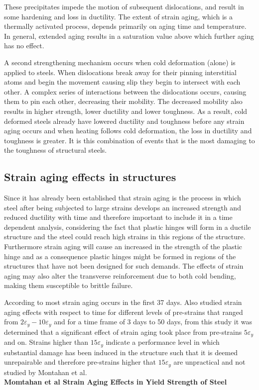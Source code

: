 These precipitates impede the motion of subsequent dislocations, and result in some hardening and loss in ductility. The extent of strain aging, which is a thermally activated process, depends primarily on aging time and temperature. In general, extended aging results in a saturation value above which further aging has no effect.

A second strengthening mechanism occurs when cold deformation (alone) is applied to steels. When dislocations break away for their pinning interstitial atoms and begin the movement causing slip they begin to intersect with each other. A complex series of interactions between the dislocations occurs, causing them to pin each other, decreasing their mobility. The decreased mobility also results in higher strength, lower ductility and lower toughness. As a result, cold deformed steels already have lowered ductility and toughness before any strain aging occurs and when heating follows cold deformation, the loss in ductility and toughness is greater. It is this combination of events that is the most damaging to the toughness of structural steels.

\subsection{Strain aging effects in structures}

Since it has already been established that strain aging is the process in which steel after being subjected to large strains develops an increased strength and reduced ductility with time and therefore important to include it in a time dependent analysis, considering the fact that plastic hinges will form in a ductile structure and the steel could reach high strains in this regions of the structure. Furthermore strain aging will cause an increased in the strength of the plastic hinge and as a consequence plastic hinges might be formed in regions of the structures that have not been designed for such demands. The effects of strain aging may also alter the transverse reinforcement due to both cold bending, making them susceptible to brittle failure.

According to \cite{Restrepo-Posada1994} most strain aging occurs in the first 37 days. Also \cite{Momtahan2009} studied strain aging effects with respect to time for different levels of pre-strains that ranged from $2\varepsilon_y - 10\varepsilon_y$ and for a time frame of 3 days to 50 days, from this study it was determined that a significant effect of strain aging took place from pre-strains $5\varepsilon_y$ and on. Strains higher than $15\varepsilon_y$ indicate a performance level in which substantial damage has been induced in the structure such that it is deemed unrepairable and therefore pre-strains higher that $15\varepsilon_y$ are unpractical and not studied by Montahan et al\cite{Momtahan2009}.
\\
\textbf{Momtahan et al Strain Aging Effects in Yield Strength of Steel}

